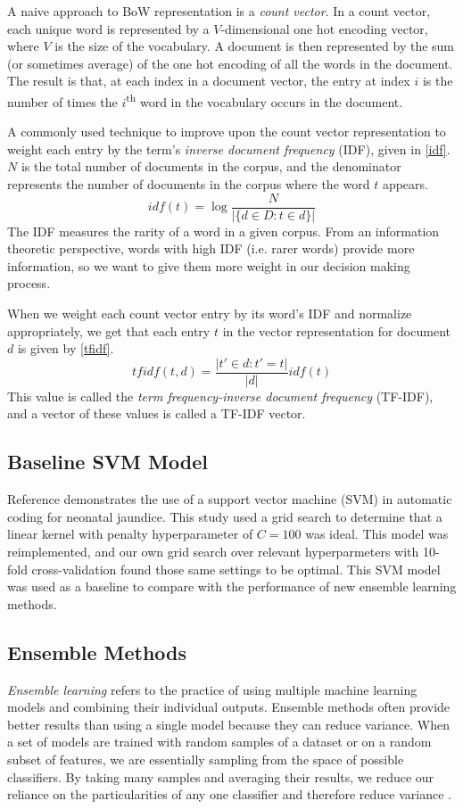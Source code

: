 \documentclass[conference]{IEEEtran}
\begin{document}
A naive approach to BoW representation is a \textit{count vector}. In a count vector, each unique word is represented by a $V$-dimensional one hot encoding vector, where $V$ is the size of the vocabulary. A document is then represented by the sum (or sometimes average) of the one hot encoding of all the words in the document. The result is that, at each index in a document vector, the entry at index $i$ is the number of times the $i$\textsuperscript{th} word in the vocabulary occurs in the document.

A commonly used technique to improve upon the count vector representation to weight each entry by the term's \textit{inverse document frequency} (IDF), given in \eqref{idf}. $N$ is the total number of documents in the corpus, and the denominator represents the number of documents in the corpus where the word $t$ appears.
\begin{equation}
idf(t) = \log \frac{N}{|\{d \in D : t \in d\} |}\label{idf}
\end{equation}
The IDF measures the rarity of a word in a given corpus. From an information theoretic perspective, words with high IDF (i.e. rarer words) provide more information, so we want to give them more weight in our decision making process.

When we weight each count vector entry by its word's IDF and normalize appropriately, we get that each entry $t$ in the vector representation for document $d$ is given by \eqref{tfidf}.
\begin{equation}
tfidf(t, d) = \frac{|t' \in d : t' = t|}{|d|} idf(t)\label{tfidf}
\end{equation}
This value is called the \textit{term frequency-inverse document frequency} (TF-IDF), and a vector of these values is called a TF-IDF vector.

\subsection{Baseline SVM Model}\label{AA}
Reference \cite{Marafino} demonstrates the use of a support vector machine (SVM) in automatic coding for neonatal jaundice. This study used a grid search to determine that a linear kernel with penalty hyperparameter of $C=100$ was ideal. This model was reimplemented, and our own grid search over relevant hyperparmeters with 10-fold cross-validation found those same settings to be optimal. This SVM model was used as a baseline to compare with the performance of new ensemble learning methods. 
\subsection{Ensemble Methods}\label{AA}
\textit{Ensemble learning} refers to the practice of using multiple machine learning models and combining their individual outputs. Ensemble methods often provide better results than using a single model because they can reduce variance. When a set of models are trained with random samples of a dataset or on a random subset of features, we are essentially sampling from the space of possible classifiers. By taking many samples and averaging their results, we reduce our reliance on the particularities of any one classifier and therefore reduce variance \cite{Dietterich}.
\end{document}
